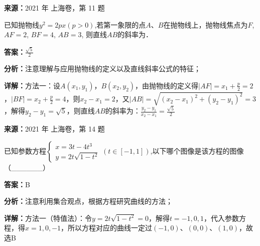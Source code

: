 \begin{question}[points=5]
\textbf{来源：}2021 年 上海卷，第 11 题\par
已知抛物线$y^2=2px(p>0)$,若第一象限的点$A$、$B$在抛物线上，抛物线焦点为$F$, $AF=2$, $BF=4$, $AB=3$, 则直线$AB$的斜率为．
\begin{solution}
\textbf{答案：}$\frac{\sqrt{5}}{2}$

\textbf{分析：}注意理解与应用抛物线的定义以及直线斜率公式的特征；

\textbf{详解：}方法一：设$A(x_1,y_1)$，$B(x_2,y_2)$，由抛物线的定义得$|AF|=x_1+\frac{p}{2}=2$，$|BF|=x_2+\frac{p}{2}=4$，则$x_2-x_1=2$，又$|AB|=\sqrt{(x_2-x_1)^2+(y_2-y_1)^2}=3$，解得$y_2-y_1=\sqrt{5}$，则直线$AB$的斜率为：$\frac{y_2-y_1}{x_2-x_1}=\frac{\sqrt{5}}{2}$
\end{solution}
\end{question}

\begin{question}[points=5]
\textbf{来源：}2021 年 上海卷，第 14 题\par
已知参数方程$\begin{cases}x=3t-4t^3\\y=2t\sqrt{1-t^2}\end{cases}(t\in[-1,1])$,以下哪个图像是该方程的图像（\_\_\_\_\_\_）
\begin{choices}
\end{choices}
\begin{solution}
\textbf{答案：}B

\textbf{分析：}注意利用集合观点，根据方程研究曲线的方法；

\textbf{详解：}方法一（特值法）：令$y=2t\sqrt{1-t^2}=0$，解得$t=-1,0,1$，代入参数方程，得$x=1,0,-1$，所以方程对应的曲线一定过$(-1,0)$、$(0,0)$、$(1,0)$，故选B
\end{solution}
\end{question}

